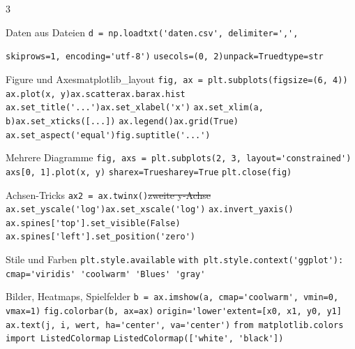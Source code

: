 \documentclass[9pt,a4paper,landscape]{extarticle}
\begin{document}
\begin{multicols*}{3}
\begin{merkblock}{Daten aus Dateien}{}
\lstinline!d = np.loadtxt('daten.csv', delimiter=',',!\par
\quad\lstinline!skiprows=1, encoding='utf-8')!\zl
\lstinline!usecols=(0, 2)!\quad\lstinline!unpack=True!\quad\lstinline!dtype=str!\zl
\end{merkblock}

\begin{merkblock}[3 Layout]{Figure und Axes}{matplotlib\_layout}
\lstinline!fig, ax = plt.subplots(figsize=(6, 4))!\zl
\lstinline!ax.plot(x, y)!\quad\lstinline!ax.scatter!\quad\lstinline!ax.bar!\quad\lstinline!ax.hist!\zl
\lstinline!ax.set_title('...')!\quad\lstinline!ax.set_xlabel('x')!\zl
\lstinline!ax.set_xlim(a, b)!\quad\lstinline!ax.set_xticks([...])!\zl
\lstinline!ax.legend()!\quad\lstinline!ax.grid(True)!\zl
\lstinline!ax.set_aspect('equal')!\quad\lstinline!fig.suptitle('...')!\zl
\end{merkblock}

\begin{merkblock}{Mehrere Diagramme}{}
\lstinline!fig, axs = plt.subplots(2, 3, layout='constrained')!\zl
\lstinline!axs[0, 1].plot(x, y)!\zl
\lstinline!sharex=True!\quad\lstinline!sharey=True!\zl
\lstinline!plt.close(fig)!\zl
\end{merkblock}

\begin{merkblock}{Achsen-Tricks}{}
\lstinline!ax2 = ax.twinx()!\st{zweite y-Achse}
\lstinline!ax.set_yscale('log')!\quad\lstinline!ax.set_xscale('log')!\zl
\lstinline!ax.invert_yaxis()!\zl
\lstinline!ax.spines['top'].set_visible(False)!\zl
\lstinline!ax.spines['left'].set_position('zero')!\zl
\end{merkblock}

\begin{merkblock}{Stile und Farben}{}
\lstinline!plt.style.available!\zl
\lstinline!with plt.style.context('ggplot'):!\zl
\lstinline!cmap='viridis' 'coolwarm' 'Blues' 'gray'!\zl
\end{merkblock}

\begin{merkblock}{Bilder, Heatmaps, Spielfelder}{}
\lstinline!b = ax.imshow(a, cmap='coolwarm', vmin=0, vmax=1)!\zl
\lstinline!fig.colorbar(b, ax=ax)!\zl
\lstinline!origin='lower'!\quad\lstinline!extent=[x0, x1, y0, y1]!\zl
\lstinline!ax.text(j, i, wert, ha='center', va='center')!\zl
\lstinline!from matplotlib.colors import ListedColormap!\zl
\lstinline!ListedColormap(['white', 'black'])!\zl
\end{merkblock}


\end{multicols*}
\end{document}
